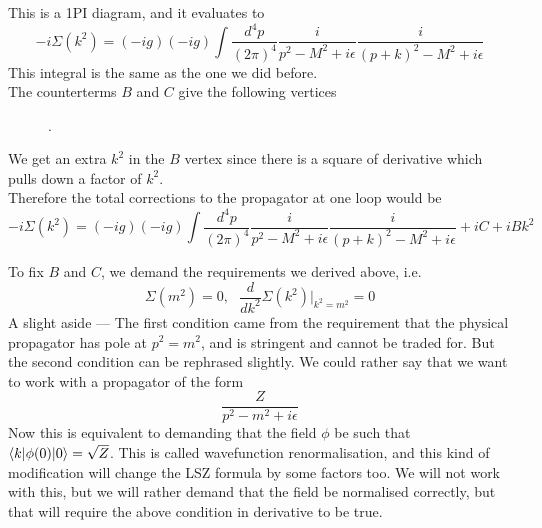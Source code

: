 \documentclass[11pt]{article}
\numberwithin{equation}{section}
\begin{document}
This is a 1PI diagram, and it evaluates to
\begin{equation*}
    -i\Sigma(k^2) =(-ig)(-ig) \int\frac{d^4p}{(2\pi)^4} \frac{i}{p^2 - M^2 + i\epsilon}\frac{i}{(p+k)^2 - M^2 + i\epsilon}
\end{equation*}
This integral is the same as the one we did before.\\

The counterterms \(B\) and \(C\) give the following vertices 
\begin{figure}[h]
    \centering
    .
\end{figure}

We get an extra \(k^2\) in the \(B\) vertex since there is a square of derivative which pulls down a factor of \(k^2\).\\

Therefore the total corrections to the propagator at one loop would be 
\begin{equation*}
    -i\Sigma(k^2) =(-ig)(-ig) \int\frac{d^4p}{(2\pi)^4} \frac{i}{p^2 - M^2 + i\epsilon}\frac{i}{(p+k)^2 - M^2 + i\epsilon} + iC + iBk^2
\end{equation*}

To fix \(B\) and \(C\), we demand the requirements we derived above, i.e.\begin{equation*}
    \Sigma(m^2) = 0, ~~~\frac{d}{dk^2}\Sigma(k^2)\bigg|_{k^2 = m^2} = 0
\end{equation*}
A slight aside — The first condition came from the requirement that the physical propagator has pole at \(p^2 = m^2\), and is stringent and cannot be traded for. But the second condition can be rephrased slightly. We could rather say that we want to work with a propagator of the form 
\begin{equation*}
    \frac{Z}{p^2 - m^2 + i\epsilon}
\end{equation*}
Now this is equivalent to demanding that the field \(\phi\) be such that \(\braket{k|\phi(0)|0} = \sqrt{Z}\). This is called wavefunction renormalisation, and this kind of modification will change the LSZ formula by some factors too. We will not work with this, but we will rather demand that the field be normalised correctly, but that will require the above condition in derivative to be true. \\
\end{document}
